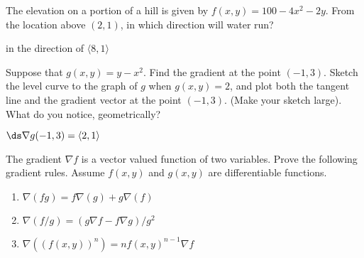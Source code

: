 \begin{enumialphparenastyle}
\begin{ex}
The elevation on a portion of a hill is given by $f(x,y) =
100 -4x^2 - 2y$.  From the location above $(2,1)$, in which direction will
water run?
\begin{sol}
in the direction of $\langle 8,1\rangle$
\end{sol}
\end{ex}

\begin{ex}
Suppose that $g(x,y)=y-x^2$.  Find the gradient at the point
$(-1, 3)$.  Sketch the level curve to the graph of $g$ when
$g(x,y)=2$, and plot both the tangent line and the gradient vector at
the point $(-1,3)$. (Make your sketch large).  What do you notice,
geometrically?
\begin{sol}
$\ds \nabla g(-1,3)=\langle 2,1\rangle$
\end{sol}
\end{ex}

\begin{ex}
The gradient $\nabla f$ is a vector
valued function of two variables.  Prove the following gradient rules.
Assume $f(x,y)$ and $g(x,y)$ are differentiable functions.

\begin{enumerate}
	\item $\nabla(fg)=f\nabla(g)+g\nabla(f)$
	\item $\nabla(f/g)=(g\nabla f - f \nabla g)/g^2$
	\item $\nabla((f(x,y))^n)=nf(x,y)^{n-1}\nabla f$
\end{enumerate}
\end{ex}

\end{enumialphparenastyle}
